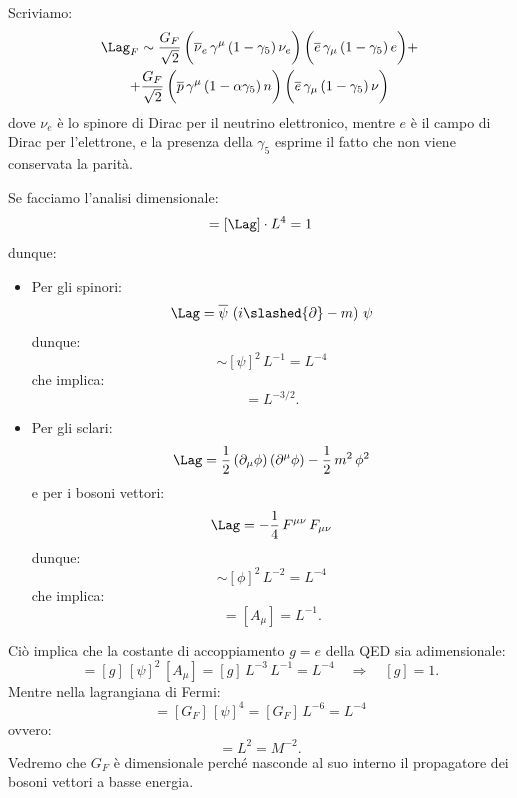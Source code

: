 Scriviamo:
\begin{multline}
    \Lag_F \sim \frac{G_F}{\sqrt{2}}\, \bigg( \overline{\nu}_e\, \gamma^\mu\, (1-\gamma_5)\, \nu_e \bigg)\, \bigg( \overline{e}\, \gamma_\mu\, (1-\gamma_5)\, e \bigg) + \\
    + \frac{G_F}{\sqrt{2}}\, \bigg( \overline{p}\, \gamma^\mu\, (1-\alpha\gamma_5)\, n \bigg)\, \bigg( \overline{e}\, \gamma_\mu\, (1-\gamma_5)\, \nu \bigg)
\end{multline}
dove $\nu_e$ è lo spinore di Dirac per il neutrino elettronico, mentre $e$ è il campo di Dirac per l'elettrone, e la presenza della $\gamma_5$ esprime il fatto che non viene conservata la parità.

Se facciamo l'analisi dimensionale:
\begin{equation}
    [S] = [\Lag]\cdot L^4 = 1
\end{equation}
dunque:
\begin{itemize}
    \item Per gli spinori:
    \begin{equation}
        \Lag = \overline{\psi}\, \left( i\slashed{\partial} - m \right)\, \psi
    \end{equation}
    dunque:
    \begin{equation*}
        [\Lag] \sim [\psi]^2\, L^{-1} = L^{-4}
    \end{equation*}
    che implica:
    \begin{equation*}
        [\psi] = L^{-3/2}.
    \end{equation*}
    \item Per gli sclari:
    \begin{equation}
        \Lag = \frac{1}{2}\, (\partial_\mu\phi)\, (\partial^\mu\phi) - \frac{1}{2}\, m^2\, \phi^2
    \end{equation}
    e per i bosoni vettori:
    \begin{equation}
        \Lag = -\frac{1}{4}\, F^{\mu\nu}\, F_{\mu\nu}
    \end{equation}
    dunque:
    \begin{equation*}
        [\Lag] \sim [\phi]^2\, L^{-2} = L^{-4}
    \end{equation*}
    che implica:
    \begin{equation*}
        [\phi] = [ A_\mu ] =  L^{-1}.
    \end{equation*}
\end{itemize}
Ciò implica che la costante di accoppiamento $g=e$ della QED sia adimensionale:
\begin{equation}
    [\Lag] = [g]\, [\psi]^2\, [A_\mu] = [g]\, L^{-3}\, L^{-1} = L^{-4} \quad \Longrightarrow \quad [g] = 1.
\end{equation}
Mentre nella lagrangiana di Fermi:
\begin{equation}
    [\Lag] = [G_F]\, [\psi]^4 = [G_F]\, L^{-6} = L^{-4}
\end{equation}
ovvero:
\begin{equation}
    [G_F] = L^2 = M^{-2}.
\end{equation}
Vedremo che $G_F$ è dimensionale perché nasconde al suo interno il propagatore dei bosoni vettori a basse energia.


